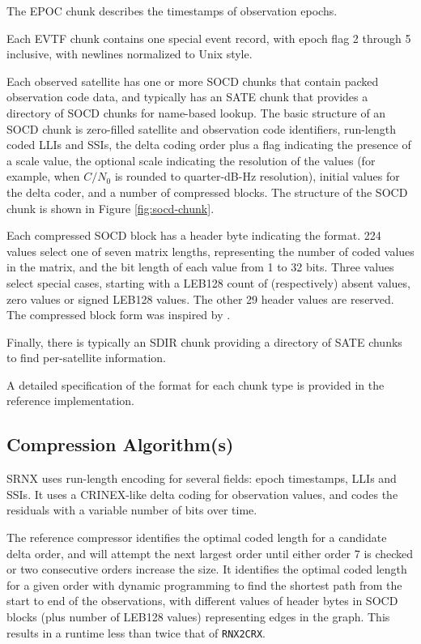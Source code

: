 \documentclass[letterpaper,times]{IONconf-v2}
\begin{document}
The EPOC chunk describes the timestamps of observation epochs.

Each EVTF chunk contains one special event record, with epoch flag 2
through 5 inclusive, with newlines normalized to Unix style.

Each observed satellite has one or more SOCD chunks that contain packed
observation code data, and typically has an SATE chunk that provides a
directory of SOCD chunks for name-based lookup.
The basic structure of an SOCD chunk is zero-filled satellite and
observation code identifiers, run-length coded LLIs and SSIs, the delta
coding order plus a flag indicating the presence of a scale value,
the optional scale indicating the resolution of the values
(for example, when $C/N_0$ is rounded to quarter-dB-Hz resolution),
initial values for the delta coder, and a number of compressed blocks.
The structure of the SOCD chunk is shown in Figure \ref{fig:socd-chunk}.

Each compressed SOCD block has a header byte indicating the format.
224 values select one of seven matrix lengths, representing the number
of coded values in the matrix, and the bit length of each value from 1
to 32 bits.
Three values select special cases, starting with a LEB128 count of
(respectively) absent values, zero values or signed LEB128 values.
The other 29 header values are reserved.
The compressed block form was inspired by \cite{https://doi.org/10.1002/spe.2203}.

Finally, there is typically an SDIR chunk providing a directory of SATE
chunks to find per-satellite information.

A detailed specification of the format for each chunk type is provided
in the reference implementation.

\subsection{Compression Algorithm(s)}

SRNX uses run-length encoding for several fields: epoch timestamps,
LLIs and SSIs.
It uses a CRINEX-like delta coding for observation values, and codes the
residuals with a variable number of bits over time.

The reference compressor identifies the optimal coded length for a
candidate delta order, and will attempt the next largest order until
either order 7 is checked or two consecutive orders increase the size.
It identifies the optimal coded length for a given order with dynamic
programming to find the shortest path from the start to end of the
observations, with different values of header bytes in SOCD blocks
(plus number of LEB128 values) representing edges in the graph.
This results in a runtime less than twice that of \texttt{RNX2CRX}.
\end{document}
